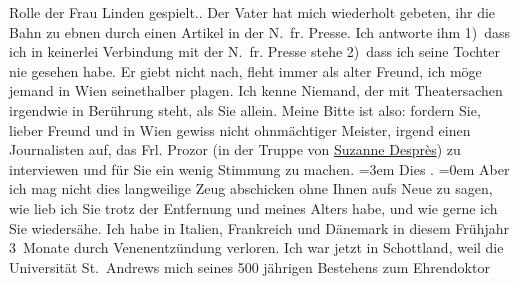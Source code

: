 \begin{ledgroupsized}[t]{13cm}
{{{                  Rolle der Frau Linden
                  gespielt.}}}\label{K_L02033_1h}. Der Vater hat mich wiederholt gebeten, ihr die Bahn zu ebnen durch einen Artikel
               in der N. fr. Presse. Ich antworte ihm 1) dass
               ich in keinerlei Verbindung mit der N. fr. Presse
               stehe 2) dass ich seine Tochter nie gesehen habe.\pend
           \pstart
           Er giebt nicht nach, fleht immer als alter Freund, ich möge jemand in Wien seinet{\pb}halber plagen.\pend
           \pstart
           Ich kenne Niemand, der mit Theatersachen irgendwie in Berührung steht, als Sie
               allein.\pend
           \pstart
           Meine Bitte ist also: fordern Sie, lieber Freund und in Wien gewiss nicht ohnmächtiger Meister, irgend einen Journalisten auf, das
               Frl. Prozor (in der Truppe von \uline{Suzanne Desprès}) zu interviewen und für Sie ein wenig Stimmung zu machen.\pend
           \leftskip=3em{}\pstart
           \noindent{}Dies \label{K_L02033_2v}\label{K_L02033_2h}.\pend
           \leftskip=0em{}\pstart
           \noindent{}Aber ich mag nicht dies langweilige Zeug abschicken ohne Ihnen aufs Neue zu sagen,
               wie lieb ich Sie trotz der Entfernung und meines Alters habe, und wie gerne ich Sie
               wiedersähe.\pend
           \pstart
           Ich habe in Italien, Frankreich und Dänemark in
               diesem Frühjahr 3 Monate durch Venenentzündung verloren. Ich war jetzt in {\pb}Schottland, weil die Universität St. Andrews mich \label{K_L02033_3v}\label{K_L02033_3h} seines 500 jährigen Bestehens zum Ehrendoktor

\end{ledgroupsized}
